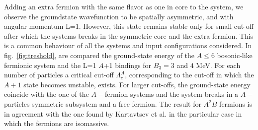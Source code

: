 \documentclass[preprint,12pt]{elsarticle}
\newcommand{\figref}[1]{fig.~\ref{#1}}
\begin{document}
Adding an extra fermion with the same flavor as one in core to the system, we observe the groundstate wavefunction to be 
spatially asymmetric, and with angular momentum L=1.
However, this state remains stable only for small cut-off after which the systems breaks in the symmetric core and the extra 
fermion.
This is a common behaviour of all the systems and input configurations considered.
In \figref{fig:treshold}, are compared the ground-state energy of the $A\le 6$  bosonic-like fermionic system and the 
L=1 $A$+1 bindings for $B_3=3$ and $4$ MeV.
For each number of particles a critical cut-off $\Lambda_c^A$, corresponding to the cut-off in which the $A+1$ state becomes 
unstable, exists.
For larger cut-offs, the ground-state energy coincide with the one of the $A-$fermion systems and the system breaks in a $A-$
particles symmetric subsystem and a free fermion.
The result for $A^2B$ fermions is in agreement with the one found by Kartavtsev et al. \cite{Kartavtsev_2007} in the 
particular case in which the fermions are isomassive.
\end{document}
